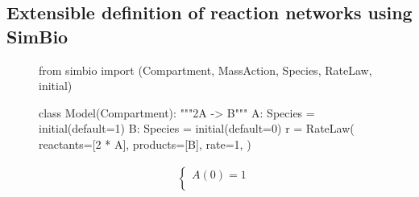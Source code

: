 \documentclass[namedate,numsec,webpdf,modern,large]{oup-authoring-template}
\theoremstyle{thmstyleone}%
\theoremstyle{thmstyletwo}%
\theoremstyle{thmstylethree}%
\newenvironment{CodeInput}{\begin{tcolorbox}[title=input,boxrule=0pt]}{\end{tcolorbox}}
\newcommand{\KeywordTok}[1]{\textcolor[rgb]{0.00,0.13,1.00}{#1}}
\newcommand{\ClassTok}[1]{\textcolor[rgb]{0.27,0.56,0.65}{#1}}
\newcommand{\OperatorTok}[1]{\textcolor[rgb]{0.00,0.00,0.00}{#1}}
\newcommand{\VariableTok}[1]{\textcolor[rgb]{0.00,0.06,0.50}{#1}}
\newcommand{\ValueTok}[1]{\textcolor[rgb]{0.13,0.57,0.41}{#1}}
\newcommand{\FunctionTok}[1]{\textcolor[rgb]{0.47,0.37,0.15}{#1}}
\newcommand{\NormalTok}[1]{\textcolor[rgb]{0.00,0.06,0.50}{#1}}
\newcommand{\CommentTok}[1]{\textcolor[rgb]{0.00,0.50,0.00}{#1}}
\begin{document}
\subsection{Extensible definition of reaction networks using SimBio}
\label{extensible-definition-of-reaction-networks-using-simbio}

\begin{figure}[t]
  
  \begin{minipage}[t]{\columnwidth}
    \begin{CodeInput}
\begin{Highlighting}[]
\KeywordTok{from} \ClassTok{simbio} \KeywordTok{import} (\ClassTok{Compartment}, \ClassTok{MassAction},
                    \ClassTok{Species}, \ClassTok{RateLaw}, \FunctionTok{initial})
\end{Highlighting}
    \end{CodeInput}
  \end{minipage}%
  \newline
  \begin{minipage}[t]{\columnwidth}
    \begin{minipage}[c]{0.7\columnwidth}
      \begin{CodeInput}
\begin{Highlighting}[]
\KeywordTok{class}\ClassTok{ Model}\KeywordTok{(}\ClassTok{Compartment}\KeywordTok{)}:
  \CommentTok{"""2A {-}\textgreater{} B"""}
\VariableTok{    A}: \ClassTok{Species }\OperatorTok{=}\FunctionTok{ initial}\KeywordTok{(}\VariableTok{default}\OperatorTok{=}\ValueTok{1}\KeywordTok{)}
\VariableTok{    B}: \ClassTok{Species }\OperatorTok{=}\FunctionTok{ initial}\KeywordTok{(}\VariableTok{default}\OperatorTok{=}\ValueTok{0}\KeywordTok{)}
\VariableTok{    r }\OperatorTok{=}\ClassTok{ RateLaw}\KeywordTok{(}
\VariableTok{        reactants}\OperatorTok{=}\KeywordTok{[}\ValueTok{2} \OperatorTok{*}\VariableTok{ A}\KeywordTok{]},
\VariableTok{        products}\OperatorTok{=}\NormalTok{\KeywordTok{[}B\KeywordTok{]},}
\VariableTok{        rate}\OperatorTok{=}\ValueTok{1}\NormalTok{,}
\KeywordTok{    )}
\end{Highlighting}
      \end{CodeInput}
    \end{minipage}%
    \begin{minipage}[c]{0.3\columnwidth}
      \begin{align*}
        & \begin{cases}
          A(0) = 1 \\

\end{cases}
\end{align*}
\end{minipage}
\end{minipage}
\end{figure}
\end{document}
